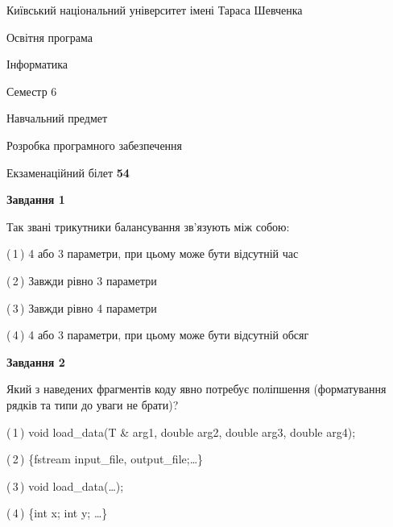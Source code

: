 \documentclass[10pt, ukrainian]{article}
\begin{document}
{{\begin {small}\par
{ \center  Київський національний університет імені Тараса Шевченка \par}
{\parbox {5 cm}{Освітня програма \hfill}{\parbox {7 cm}{Інформатика \hfill}}\parbox {6 cm}{\hfill Семестр 6}}\par
{\parbox {5 cm} {Навчальний предмет \hfill}\parbox {7 cm}{Розробка програмного забезпечення \hfill}\parbox {6cm}{\hfill}\par}\vspace{-7pt} \end{small}}{\center Екзаменаційний білет \No \textbf
{ 54 }\par}}
{
\begin {large}
{\begin {center}\textbf{Завдання 1}\end {center}}\par
Так звані трикутники балансування зв'язують між собою:\par
\vspace{2mm}



(\,1\,) 4 або 3 параметри, при цьому може бути відсутній час%



(\,2\,) Завжди рівно 3 параметри%



(\,3\,) Завжди рівно 4 параметри%



(\,4\,) 4 або 3 параметри, при цьому може бути відсутній обсяг %


{\begin {center}\textbf{Завдання 2}\end {center}}\par
Який з наведених фрагментів коду явно потребує поліпшення (форматування рядків та типи до уваги не брати)?\par
\vspace{2mm}



(\,1\,) void load\_data(T \& arg1, double arg2, double arg3, double arg4); %



(\,2\,) \{fstream input\_file, output\_file;…\} %



(\,3\,) void load\_data(…);%



(\,4\,) \{int x; int y; …\}%



\end{large}}
\end{document}
